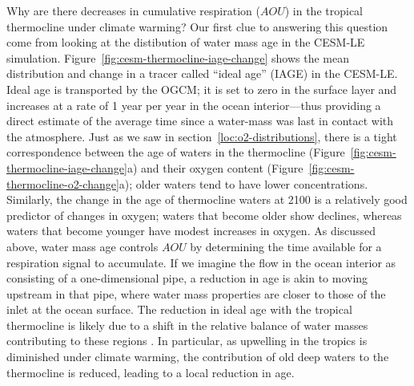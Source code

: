 \documentclass{report_chapter}
\begin{document}
Why are there decreases in cumulative respiration ($AOU$) in the tropical thermocline under climate warming?
Our first clue to answering this question come from looking at the distibution of water mass age in the CESM-LE simulation. Figure~\ref{fig:cesm-thermocline-iage-change} shows the mean distribution and change in a tracer called ``ideal age'' (IAGE) in the CESM-LE.
Ideal age is transported by the OGCM; it is set to zero in the surface layer and increases at a rate of 1 year per year in the ocean interior---thus providing a direct estimate of the average time since a water-mass was last in contact with the atmosphere.
Just as we saw in section~\ref{loc:o2-distributions}, there is a tight correspondence between the age of waters in the thermocline (Figure~\ref{fig:cesm-thermocline-iage-change}a) and their oxygen content (Figure~\ref{fig:cesm-thermocline-o2-change}a); older waters tend to have lower \OO{} concentrations.
Similarly, the change in the age of thermocline waters at 2100 is a relatively good predictor of changes in oxygen; waters that become older show \OO{} declines, whereas waters that become younger have modest increases in oxygen.
As discussed above, water mass age controls $AOU$ by determining the time available for a respiration signal to accumulate.
If we imagine the flow in the ocean interior as consisting of a one-dimensional pipe, a reduction in age is akin to moving upstream in that pipe, where water mass properties are closer to those of the inlet at the ocean surface.
The reduction in ideal age with the tropical thermocline is likely due to a shift in the relative balance of water masses contributing to these regions \citep{Gnanadesikan-Russell-etal-2007}.
In particular, as upwelling in the tropics is diminished under climate warming, the contribution of old deep waters to the thermocline is reduced, leading to a local reduction in age.
\end{document}
